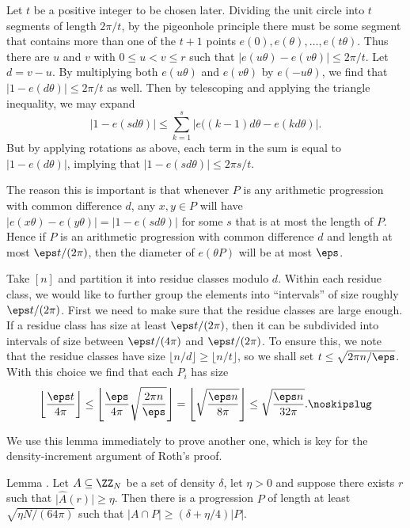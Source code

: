 \proof Let $t$ be a positive integer to be chosen later. Dividing the unit circle into $t$ segments of
length $2\pi/t$, by the pigeonhole principle there must be some segment that contains more than one of
the $t+1$ points $e(0), e(\theta), \ldots, e(t\theta)$. Thus there are $u$ and $v$ with $0\le u<v\le r$ such that
$\bigl|e(u\theta) - e(v\theta)\bigr|\le 2\pi/t$. Let $d = v-u$. By multiplying both $e(u\theta)$ and
$e(v\theta)$ by $e(-u\theta)$, we find that $\bigl|1-e(d\theta)\bigr| \le 2\pi/t$ as well. Then by telescoping and
applying the triangle inequality, we may expand
$$\bigl|1-e(sd\theta)\bigl| \le \sum_{k=1}^s \bigl|e\bigl((k-1)d\theta-e(kd\theta)\bigr|.$$
But by applying rotations as above, each term in the sum is equal to $\bigl|1-e(d\theta)\bigr|$,
implying that $\bigl|1-e(sd\theta)\bigl| \le 2\pi s/t$.

The reason this is important is that
whenever $P$ is any arithmetic progression with common difference $d$, any $x,y\in P$ will
have $\bigl|e(x\theta) - e(y\theta)\bigr| = \bigl|1-e(sd\theta)\bigr|$ for some $s$ that is at most
the length of $P$. Hence if $P$ is an arithmetic progression with common difference $d$ and length
at most $\eps t/(2\pi)$, then the diameter of $e(\theta P)$ will be at most $\eps$.

Take $[n]$ and partition it into residue classes modulo $d$. Within each residue class, we would like
to further group the elements into ``intervals'' of size roughly $\eps t/(2\pi)$. First we need to make
sure that the residue classes are large enough. If a residue class has size at least $\eps t/(2\pi)$,
then it can be subdivided into intervals of size between $\eps t/(4\pi)$ and $\eps t/(2\pi)$.
To ensure this, we note that the residue classes have size $\lfloor n/d\rfloor \ge \lfloor n/t\rfloor$,
so we shall set $t \le \sqrt{2\pi n / \eps}$. With this choice we find that each $P_i$ has size
$$\biggl\lfloor {\eps t\over 4\pi}\biggr\rfloor \le  \Biggl\lfloor {\eps\over 4\pi} \sqrt{2\pi n\over \eps}
\Biggr\rfloor = \Biggl\lfloor \sqrt{\eps n\over 8\pi} \Biggr\rfloor \le \sqrt{\eps n\over 32\pi}.\noskipslug$$

We use this lemma immediately to prove another one, which is key for the density-increment argument
of Roth's proof.

\edef\lemdensityincrement{\the\thmcount}
\proclaim Lemma {\advthm}. Let $A\subseteq \ZZ_N$ be a set of density $\delta$, let $\eta>0$ and suppose
there exists $r$ such that $\bigl| \hat A(r)\bigr| \ge \eta$. Then there is a progression $P$ of length
at least $\sqrt{\eta N/(64\pi)}$ such that $|A\cap P| \ge (\delta + \eta/4)|P|$.

